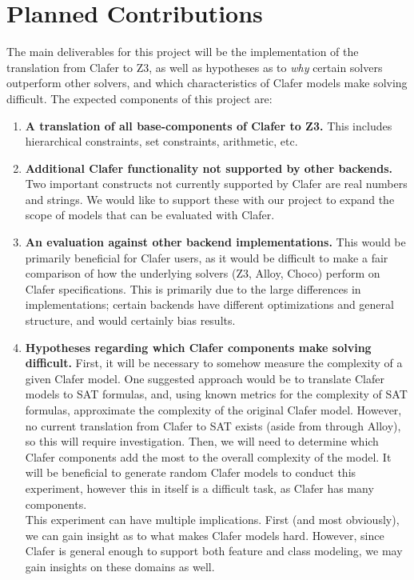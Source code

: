\documentclass{article}
\begin{document}
\section{Planned Contributions}
The main deliverables for this project will be the implementation of the translation from Clafer to Z3, as well as hypotheses as to \textit{why} certain solvers outperform other solvers, and which characteristics of Clafer models make solving difficult. The expected components of this project are: 
\begin{enumerate}
\item \textbf{A translation of all base-components of Clafer to Z3.} This includes hierarchical constraints, set constraints, arithmetic, etc. 
\item \textbf{Additional Clafer functionality not supported by other backends.} Two important constructs not currently supported by Clafer are real numbers and strings. We would like to support these with our project to expand the scope of models that can be evaluated with Clafer. 

\item \textbf{An evaluation against other backend implementations.} This would be primarily beneficial for Clafer users, as it would be difficult to make a fair comparison of how the underlying solvers (Z3, Alloy, Choco) perform on Clafer specifications. This is primarily due to the large differences in implementations; certain backends have different optimizations and general structure, and would certainly bias results.

\item \textbf{Hypotheses regarding which Clafer components make solving difficult.} First, it will be necessary to somehow measure the complexity of a given Clafer model. One suggested approach would be to translate Clafer models to SAT formulas, and, using known metrics for the complexity of SAT formulas, approximate the complexity of the original Clafer model. However, no current translation from Clafer to SAT exists (aside from through Alloy), so this will require investigation. Then, we will need to determine which Clafer components add the most to the overall complexity of the model. It will be beneficial to generate random Clafer models to conduct this experiment, however this in itself is a difficult task, as Clafer has many components. \\
\indent This experiment can have multiple implications. First (and most obviously), we can gain insight as to what makes Clafer models hard. However, since Clafer is general enough to support both feature and class modeling, we may gain insights on these domains as well.

\end{enumerate}




\end{document}
